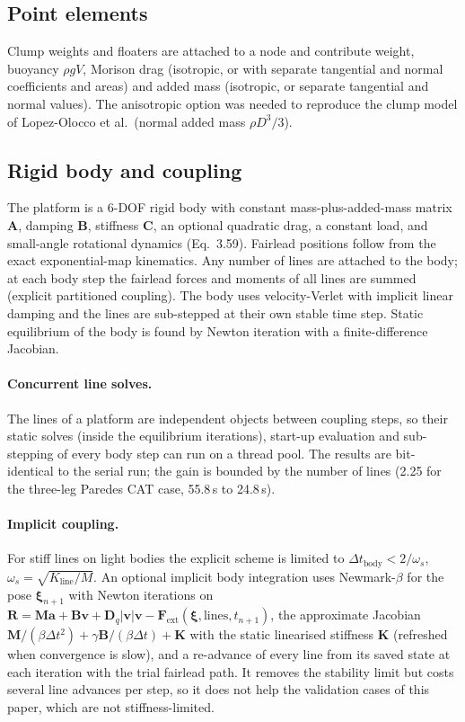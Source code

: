\documentclass[11pt,a4paper]{article}
\newcommand{\vect}[1]{\boldsymbol{#1}}
\begin{document}
\subsection{Point elements}
Clump weights and floaters are attached to a node and contribute weight, buoyancy $\rho gV$, Morison drag (isotropic, or with separate tangential and normal coefficients and areas) and added mass (isotropic, or separate tangential and normal values). The anisotropic option was needed to reproduce the clump model of Lopez-Olocco et al.\ (normal added mass $\rho D^3/3$).

\subsection{Rigid body and coupling}
The platform is a 6-DOF rigid body with constant mass-plus-added-mass matrix $\mathbf A$, damping $\mathbf B$, stiffness $\mathbf C$, an optional quadratic drag, a constant load, and small-angle rotational dynamics (Eq.~3.59). Fairlead positions follow from the exact exponential-map kinematics. Any number of lines are attached to the body; at each body step the fairlead forces and moments of all lines are summed (explicit partitioned coupling). The body uses velocity-Verlet with implicit linear damping and the lines are sub-stepped at their own stable time step. Static equilibrium of the body is found by Newton iteration with a finite-difference Jacobian.

\paragraph{Concurrent line solves.} The lines of a platform are independent objects between coupling steps, so their static solves (inside the equilibrium iterations), start-up evaluation and sub-stepping of every body step can run on a thread pool. The results are bit-identical to the serial run; the gain is bounded by the number of lines (2.25 for the three-leg Paredes CAT case, 55.8\,s to 24.8\,s).

\paragraph{Implicit coupling.} For stiff lines on light bodies the explicit scheme is limited to $\Delta t_{\mathrm{body}}<2/\omega_s$, $\omega_s=\sqrt{K_{\mathrm{line}}/M}$. An optional implicit body integration uses Newmark-$\beta$ for the pose $\vect\xi_{n+1}$ with Newton iterations on $\vect R=\mathbf M\vect a+\mathbf B\vect v+\mathbf D_q|\vect v|\vect v-\vect F_{\mathrm{ext}}(\vect\xi,\text{lines},t_{n+1})$, the approximate Jacobian $\mathbf M/(\beta\Delta t^2)+\gamma\mathbf B/(\beta\Delta t)+\mathbf K$ with the static linearised stiffness $\mathbf K$ (refreshed when convergence is slow), and a re-advance of every line from its saved state at each iteration with the trial fairlead path. It removes the stability limit but costs several line advances per step, so it does not help the validation cases of this paper, which are not stiffness-limited.
\end{document}
